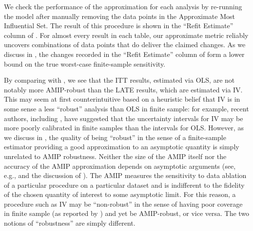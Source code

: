 We check the performance of the approximation for each analysis by re-running
the model after manually removing the data points in the Approximate Most
Influential Set. The result of this procedure is shown in the ``Refit Estimate''
column of . For almost
every result in each table, our approximate metric reliably uncovers
combinations of data points that do deliver the claimed changes. As we discuss
in , the changes recorded in the ``Refit Estimate''
column of  form a
lower bound on the true worst-case finite-sample sensitivity.

By comparing  with
, we see that the ITT results, estimated via
OLS, are not notably more AMIP-robust than the LATE results, which are estimated
via IV. This may seem at first counterintuitive based on a heuristic belief that
IV is in some sense a less ``robust'' analysis than OLS in finite sample: for
example, recent authors, including \citet{young2019consistency}, have suggested
that the uncertainty intervals for IV may be more poorly calibrated in finite
samples than the intervals for OLS.  However, as we discuss in , the
quality of being ``robust'' in the sense of a finite-sample estimator providing
a good approximation to an asymptotic quantity is simply unrelated to AMIP
robustness.  Neither the size of the AMIP itself nor the accuracy of the AMIP
approximation depends on asymptotic arguments (see, e.g.,
 and the discussion of
).  The AMIP measures the sensitivity to data ablation
of a particular procedure on a particular dataset and is indifferent to the
fidelity of the chosen quantity of interest to some asymptotic limit.  For this
reason, a procedure such as IV may be ``non-robust'' in the sense of having poor
coverage in finite sample (as reported by \citet{young2019consistency}) and yet
be AMIP-robust, or vice versa. The two notions of ``robustness'' are simply
different.

